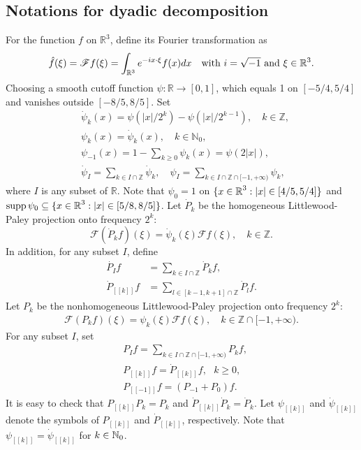 \documentclass[11pt,twoside]{article}
\def\N{\mathop{\mathbb N\kern 0pt}\nolimits}
\def\R{\mathop{\mathbb R\kern 0pt}\nolimits}
\newcommand{\pk}{\dot{P}_k}
\newcommand{\Pk}{P_k}
\DeclareMathOperator{\supp}{supp}
\theoremstyle{plain}
\theoremstyle{definition}
\numberwithin{equation}{section}
\begin{document}
	\subsection{Notations for dyadic decomposition}\label{section 2.1}
	For the function $f$ on $\mathbb{R}^3$, define its Fourier transformation as
	\begin{align*}
		\hat{f}(\xi)=\mathscr{F}f(\xi)=\int_{\mathbb{R}^3} e^{-i x\cdot\xi}f(x)dx\quad\text{with $i=\sqrt{-1}$ and $\xi\in\Bbb R^3$}.
	\end{align*}
	Choosing a smooth cutoff function $\psi\colon\mathbb{R}\rightarrow[0,1]$, which equals 1 on $[-5/4,5/4]$ and vanishes outside
	$[-8/5,8/5]$. Set
	\begin{align*}
		&\dot{\psi}_{k}(x)=\psi(|x|/2^{k})-\psi(|x|/2^{k-1}),\quad k\in\mathbb{Z},\\
		&\psi_{k}(x)=\dot{\psi}_k(x),\quad k\in\mathbb{N}_0,\\
		&\psi_{-1}(x)=1-\sum_{k\geq 0}\psi_{k}(x)=\psi(2|x|),\\
		&\dot{\psi}_{I}=\sum_{k\in I\cap\mathbb{Z}}\dot{\psi}_{k}, \quad {\psi}_{I}=\sum_{k\in I\cap\mathbb{Z}\cap[-1,+\infty)}{\psi}_{k},
	\end{align*}
	where $I$ is any subset of $\mathbb{R}$. Note that $\psi_0=1$ on $\{x\in\R^3:|x|\in[4/5,5/4]\}$ and $\supp\psi_0\subseteq\{x\in\R^3:|x|\in [5/8,8/5]\}$. Let $\pk$ be the homogeneous
	Littlewood-Paley projection onto frequency $2^k$:
	\begin{equation*}
	\mathscr{F}(\pk f)(\xi)=\dot{\psi}_{k}(\xi)\mathscr{F}f(\xi),\quad k\in\mathbb{Z}.
	\end{equation*}
	In addition, for any subset $I$, define
	\begin{align*}
		\dot{P_I}f&=\sum_{k\in I\cap\mathbb{Z}}\pk f,\\
		\dot{P}_{[[k]]}f&=\sum_{l\in[k-1,k+1]\cap\mathbb{Z}}\dot{P}_l f.
	\end{align*}
	Let $\Pk$ be the nonhomogeneous
	Littlewood-Paley projection onto frequency $2^k$:
	\begin{equation}\label{YHCCC-001}
		\begin{split}
		\mathscr{F}(\Pk f)(\xi)={\psi}_{k}(\xi)\mathscr{F}f(\xi),\quad k\in\mathbb{Z}\cap[-1,+\infty).
	\end{split}
	\end{equation}
For any subset $I$, set
	\begin{align*}
		&P_I f=\sum_{k\in I\cap\mathbb{Z}\cap\lbrack-1,+\infty)}\Pk f,\\
		&P_{[[k]]}f= \dot{P}_{[[k]]}f,\ \ \ k\geq 0,\\
		&P_{[[-1]]}f= (P_{-1}+P_{0})f.
	\end{align*}
	It is easy to check that $P_{[[k]]}P_k=P_k$ and $\dot{P}_{[[k]]}\dot{P}_k=\dot{P}_k$.
	Let $\psi_{[[k]]}$ and $\dot{\psi}_{[[k]]}$ denote the symbols of $P_{[[k]]}$ and $\dot{P}_{[[k]]}$, respectively. Note that $\psi_{[[k]]} = \dot{\psi}_{[[k]]}$ for $k\in\N_0$.
\end{document}
